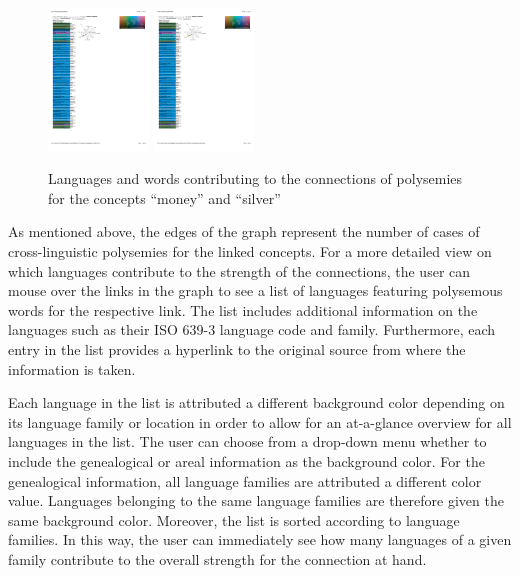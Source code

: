 \begin{figure}[htbp]
\begin{center}
\includegraphics[width=0.238\textwidth]{img/moneysilverAreas1.pdf}
\includegraphics[width=0.238\textwidth]{img/moneysilverAreas2.pdf}
\caption{Languages and words contributing to the connections of polysemies for the concepts ``money'' and ``silver''}
\label{MoneySilverAreas}
\end{center}
\end{figure}


As mentioned above, the edges of the graph represent the number of cases of cross-linguistic polysemies for the linked concepts. For a more detailed view on which languages contribute to the strength of the connections, the user can mouse over the links in the graph to see a list of  languages featuring polysemous words for the respective link. The list includes additional information on the languages such as their ISO 639-3 language code and family. Furthermore, each entry in the list provides a hyperlink to the original source from where the information is taken.  


Each language in the list is attributed a different background color depending on its language family or location in order to allow for an at-a-glance overview for all languages in the list. The user can choose from a drop-down menu whether to include the genealogical or areal information as the background color. For the genealogical information, all language families are attributed a different color value. Languages belonging to the same language families are therefore given the same background color. Moreover, the list is sorted according to language families. In this way, the user can immediately see how many languages of  a given family contribute to the overall strength for the connection at hand. 

